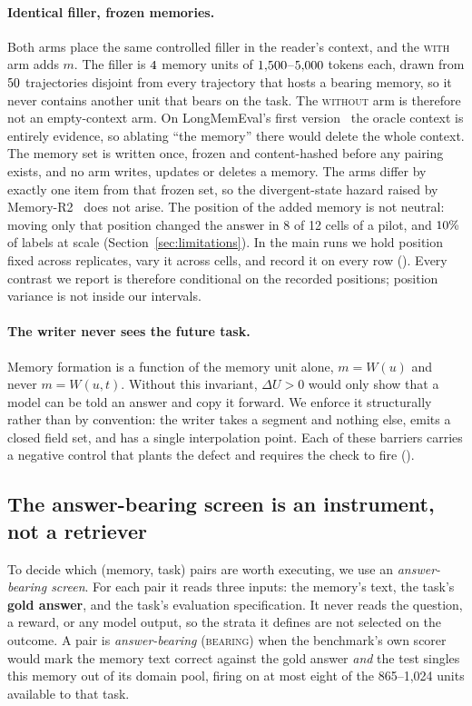 \paragraph{Identical filler, frozen memories.}
Both arms place the same controlled filler in the reader's context, and the
\textsc{with} arm adds $m$. The filler is $4$ memory units of
$1{,}500$--$5{,}000$ tokens each, drawn from $50$
trajectories disjoint from every trajectory that hosts a bearing memory, so it
never contains another unit that bears on the task. The \textsc{without} arm
is therefore not an empty-context arm. On LongMemEval's first version~\cite{lmev1} the oracle context is entirely
evidence, so ablating ``the memory'' there would delete the whole context. The memory set is written once, frozen and content-hashed before any
pairing exists, and no arm writes, updates or deletes a memory. The arms
differ by exactly one item from that frozen set, so the divergent-state
hazard raised by Memory-R2~\cite{memoryrtwo} does not arise. The position of
the added memory is not neutral: moving only that position changed the answer
in 8 of 12 cells of a pilot, and $10\%$ of labels at scale
(Section~\ref{sec:limitations}). In the main runs we hold position fixed across replicates, vary it
across cells, and record it on every row (). Every
contrast we report is therefore conditional on the recorded positions;
position variance is not inside our intervals.

\paragraph{The writer never sees the future task.}
Memory formation is a function of the memory unit alone, $m = W(u)$ and
never $m = W(u,t)$. Without this invariant, $\Delta U > 0$ would only show
that a model can be told an answer and copy it forward. We enforce it
structurally rather than by convention: the writer takes a segment and
nothing else, emits a closed field set, and has a single interpolation point.
Each of these barriers carries a negative control that plants the defect and requires
the check to fire ().

\subsection{The answer-bearing screen is an instrument, not a retriever}
\label{sec:screen}
To decide which (memory, task) pairs are worth executing, we use an
\emph{answer-bearing screen}. For each pair it reads three inputs: the memory's text,
the task's \textbf{gold answer}, and the task's evaluation specification. It
never reads the question, a reward, or any model output, so the strata it
defines are not selected on the outcome. A pair is \emph{answer-bearing} (\textsc{bearing}) when the
benchmark's own scorer would mark the memory text correct against the gold
answer \emph{and} the test singles this memory out of its domain pool, firing
on at most eight of the 865--1{,}024 units available to that task.

